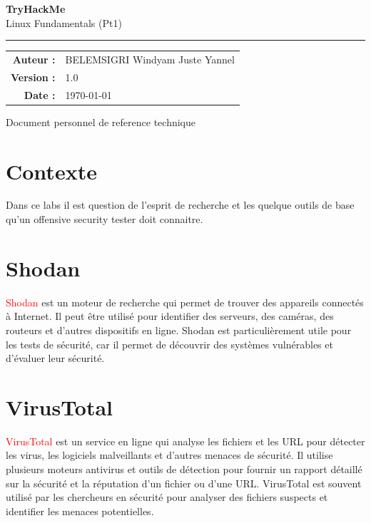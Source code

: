 \documentclass[11pt,a4paper]{book}
\begin{document}
\begin{titlepage}
\thispagestyle{empty}
\begin{center}
\vspace*{2cm}
{\Huge\sffamily\bfseries\color{bleuFonce} TryHackMe}\\[0.5em]
{\Large\sffamily\color{gris} Linux Fundamentals (Pt1)}
\vspace{1.5cm}

\textcolor{bleuClair}{\rule{0.3\textwidth}{1.5pt}}

\vspace{1.5cm}
\begin{tabular}{rl}
    \textcolor{gris}{\textbf{Auteur :}} & BELEMSIGRI Windyam Juste Yannel \\
    \textcolor{gris}{\textbf{Version :}} & 1.0 \\
    \textcolor{gris}{\textbf{Date :}} & \today \\
\end{tabular}

\vfill
{\small\sffamily\color{gris} Document personnel de reference technique}
\vspace{1cm}
\end{center}
\end{titlepage}

\tableofcontents
\newpage

\section{Contexte}
Dans ce labs il est question de l'esprit de recherche et les quelque outils de base qu'un offensive security tester doit connaitre.


\section{Shodan}
\textcolor{red}{Shodan} est un moteur de recherche qui permet de trouver des appareils connectés à Internet. 
Il peut être utilisé pour identifier des serveurs, des caméras, des routeurs et d'autres dispositifs en ligne. 
Shodan est particulièrement utile pour les tests de sécurité, car il permet de découvrir des systèmes vulnérables et d'évaluer leur sécurité.

\section{VirusTotal}
\textcolor{red}{VirusTotal} est un service en ligne qui analyse les fichiers et les URL pour détecter les virus, les logiciels malveillants et d'autres menaces de sécurité.
Il utilise plusieurs moteurs antivirus et outils de détection pour fournir un rapport détaillé sur la sécurité et la réputation d'un fichier ou d'une URL. VirusTotal est souvent utilisé par les chercheurs en sécurité pour analyser des fichiers suspects et identifier les menaces potentielles. 
\end{document}
